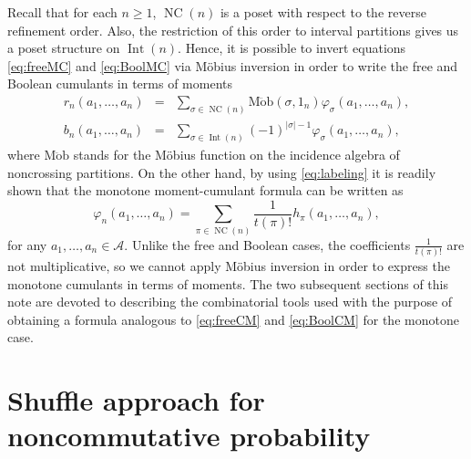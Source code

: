 \documentclass[pdftex]{sigma}%
\numberwithin{equation}{section}
\newcommand{\A}{\mathcal{A}}
\newcommand{\NC}{\operatorname{NC}}
\newcommand{\Int}{\operatorname{Int}}
\begin{document}
Recall that for each $n\geq1$, $\NC(n)$ is a poset with respect to the reverse refinement order. Also, the restriction of this order to interval partitions gives us a poset structure on $\Int(n)$. Hence, it is possible to invert equations \eqref{eq:freeMC} and \eqref{eq:BoolMC} via M\"obius inversion in order to write the free and Boolean cumulants in terms of moments
\begin{eqnarray}
	\label{eq:freeCM}
	r_n(a_1,\dots,a_n)
	&=& \sum_{\sigma \in \NC(n)} \operatorname{M\ddot{o}b}(\sigma,1_n)\varphi_\sigma(a_1,\dots,a_n),
	\\ \label{eq:BoolCM}
	b_n(a_1,\dots,a_n)
	&=& \sum_{\sigma \in \Int(n)}(-1)^{|\sigma|-1}\varphi_\sigma(a_1,\dots,a_n),
\end{eqnarray}
where $\mathrm{M\ddot{o}b}$ stands for the M\"obius function on the incidence algebra of noncrossing partitions.
On the other hand, by using \eqref{eq:labeling} it is readily shown that the monotone moment-cumulant formula can be written as
\begin{equation}
\label{eq:monMC2}
	\varphi_n(a_1,\dots,a_n) = \sum_{\pi\in \NC(n)} \frac{1}{t(\pi)!} h_\pi(a_1,\dots,a_n),
\end{equation}
for any $a_1,\dots,a_n\in \A$. Unlike the free and Boolean cases, the coefficients $\frac{1}{t(\pi)!}$ are not multiplicative, so we cannot apply M\"obius inversion in order to express the monotone cumulants in terms of moments. The two subsequent sections of this note are devoted to describing the combinatorial tools used with the purpose of obtaining a formula analogous to \eqref{eq:freeCM} and \eqref{eq:BoolCM} for the monotone case.

\fi

\section{Shuffle approach for noncommutative probability}
\label{sec:shuffle}
\end{document}
